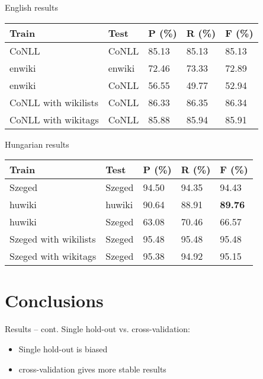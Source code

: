 \documentclass[utf8x]{beamer}
\newcommand{\vitem}{\vfill \item}
\begin{document}
\begin{frame}{English results}

\begin{center}
\begin{tabular}{lllll}
\hline \bf Train & \bf Test & \bf P (\%) & \bf R (\%) & \bf F (\%) \\ \hline
CoNLL & CoNLL & 85.13 & 85.13 & 85.13 \\
enwiki & enwiki & 72.46 & 73.33 &  72.89 \\
enwiki & CoNLL & 56.55 & 49.77 & 52.94 \\
CoNLL with wikilists & CoNLL & 86.33 & 86.35 & 86.34 \\
CoNLL with wikitags & CoNLL & 85.88 & 85.94 & 85.91 \\
\hline
\end{tabular}
\end{center}

\end{frame}

\begin{frame}{Hungarian results}

\begin{center}
\begin{tabular}{lllll}
\hline \bf Train & \bf Test & \bf P (\%) & \bf R (\%) & \bf F (\%) \\ \hline
Szeged  & Szeged  & 94.50 & 94.35 & 94.43 \\
huwiki & huwiki & 90.64 & 88.91 &  \textbf{89.76} \\
huwiki & Szeged  & 63.08 & 70.46 & 66.57 \\
Szeged  with wikilists & Szeged  & 95.48 & 95.48 & 95.48 \\
Szeged  with wikitags & Szeged  & 95.38 & 94.92 & 95.15 \\
\hline
\end{tabular}
\end{center}


\end{frame}

\section{Conclusions}
\begin{frame}{Results -- cont.}
  Single hold-out vs. cross-validation:
  \begin{itemize}
  \vitem Single hold-out is biased
  \vitem cross-validation gives more stable results
  \end{itemize}
  \vfill
\end{frame}
\end{document}
